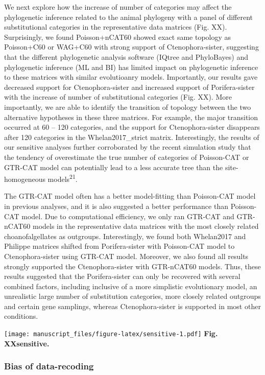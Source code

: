 \documentclass[]{article}
\begin{document}
We next explore how the increase of number of categories may affect the
phylogenetic inference related to the animal phylogeny with a panel of
different substitutional categories in the representative data matrices
(Fig. XX). Surprisingly, we found Poisson+nCAT60 showed exact same
topology as Poisson+C60 or WAG+C60 with strong support of
Ctenophora-sister, suggesting that the different phylogenetic analysis
software (IQtree and PhyloBayes) and phylogenetic inference (ML and BI)
has limited impact on phylogenetic inference to these matrices with
similar evolutioanry models. Importantly, our results gave decreased
support for Ctenophora-sister and increased support of Porifera-sister
with the increase of number of substitutional categories (Fig. XX). More
importantly, we are able to identify the transition of topology between
the two alternative hypotheses in these three matrices. For example, the
major transition occurred at 60 -- 120 categories, and the support for
Ctenophora-sister disappears after 120 categories in the
Whelan2017\_strict matrix. Interestingly, the results of our sensitive
analyses further corroborated by the recent simulation study that the
tendency of overestimate the true number of categories of Poisson-CAT or
GTR-CAT model can potentially lead to a less accurate tree than the
site-homogeneous models\textsuperscript{21}.

The GTR-CAT model often has a better model-fitting than Poisson-CAT
model in previous analyses, and it is also suggested a better
performance than Poisson-CAT model. Due to computational efficiency, we
only ran GTR-CAT and GTR-nCAT60 models in the representative data
matrices with the most closely related choanofalgellates as outgroups.
Interestingly, we found both Whelan2017 and Philippe matrices shifted
from Porifera-sister with Poisson-CAT model to Ctenophora-sister using
GTR-CAT model. Moreover, we also found all results strongly supported
the Ctenophora-sister with GTR-nCAT60 models. Thus, these results
suggested that the Porifera-sister can only be recovered with several
combined factors, including inclusive of a more simplistic evolutionary
model, an unrealistic large number of substitution categories, more
closely related outgroups and certain gene samplings, whereas
Ctenophora-sister is supported in most other conditions.

\texttt{[image: manuscript\_files/figure-latex/sensitive-1.pdf]}
\textbf{Fig. XXsensitive.}

\hypertarget{bias-of-data-recoding}{%
\subsubsection{Bias of data-recoding}\label{bias-of-data-recoding}}
\end{document}
